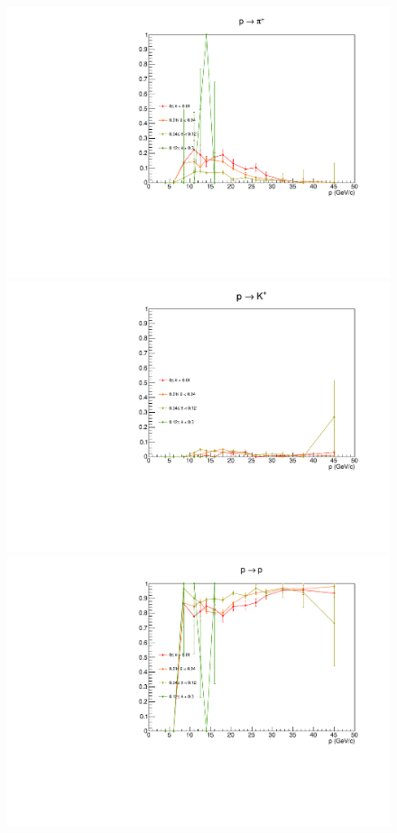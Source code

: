 \begin{figure}[!p]
  \centering
	\includegraphics[scale=0.38]{./gfx/pp_pi_less.pdf}
  \includegraphics[scale=0.38]{./gfx/pp_K_less.pdf}
  \includegraphics[scale=0.38]{./gfx/pp_p_less.pdf}

\end{figure}

